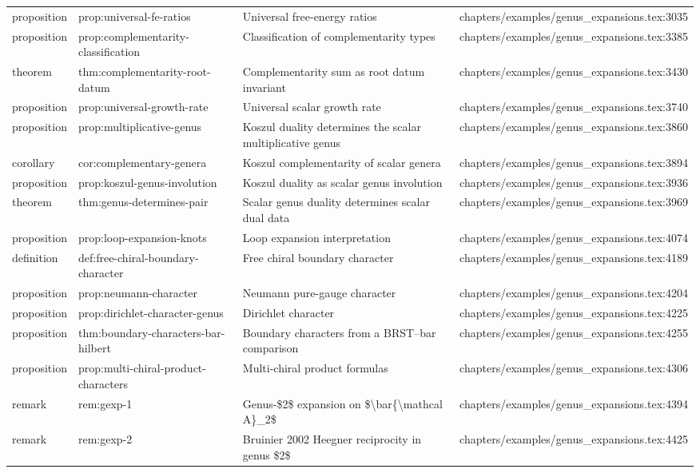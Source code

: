 \documentclass[11pt]{article}
\begin{document}
\begin{longtable}{L{0.10\textwidth}L{0.26\textwidth}L{0.42\textwidth}L{0.22\textwidth}}
proposition & prop:universal-fe-ratios & Universal free-energy ratios & chapters/examples/genus\_expansions.tex:3035\\
proposition & prop:complementarity-classification & Classification of complementarity types & chapters/examples/genus\_expansions.tex:3385\\
theorem & thm:complementarity-root-datum & Complementarity sum as root datum invariant & chapters/examples/genus\_expansions.tex:3430\\
proposition & prop:universal-growth-rate & Universal scalar growth rate & chapters/examples/genus\_expansions.tex:3740\\
proposition & prop:multiplicative-genus & Koszul duality determines the scalar multiplicative genus & chapters/examples/genus\_expansions.tex:3860\\
corollary & cor:complementary-genera & Koszul complementarity of scalar genera & chapters/examples/genus\_expansions.tex:3894\\
proposition & prop:koszul-genus-involution & Koszul duality as scalar genus involution & chapters/examples/genus\_expansions.tex:3936\\
theorem & thm:genus-determines-pair & Scalar genus duality determines scalar dual data & chapters/examples/genus\_expansions.tex:3969\\
proposition & prop:loop-expansion-knots & Loop expansion interpretation & chapters/examples/genus\_expansions.tex:4074\\
definition & def:free-chiral-boundary-character & Free chiral boundary character & chapters/examples/genus\_expansions.tex:4189\\
proposition & prop:neumann-character & Neumann pure-gauge character & chapters/examples/genus\_expansions.tex:4204\\
proposition & prop:dirichlet-character-genus & Dirichlet character & chapters/examples/genus\_expansions.tex:4225\\
proposition & thm:boundary-characters-bar-hilbert & Boundary characters from a BRST--bar comparison & chapters/examples/genus\_expansions.tex:4255\\
proposition & prop:multi-chiral-product-characters & Multi-chiral product formulas & chapters/examples/genus\_expansions.tex:4306\\
remark & rem:gexp-1 & Genus-\$2\$ expansion on \$\textbackslash{}bar\{\textbackslash{}mathcal A\}\_2\$ & chapters/examples/genus\_expansions.tex:4394\\
remark & rem:gexp-2 & Bruinier 2002 Heegner reciprocity in genus \$2\$ & chapters/examples/genus\_expansions.tex:4425\\

\end{longtable}
\end{document}
